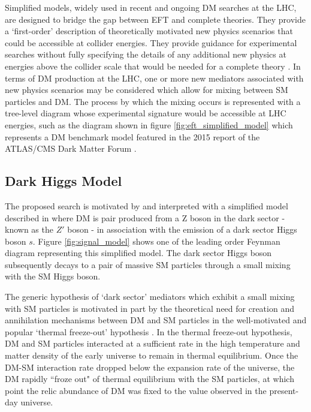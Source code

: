 \documentclass[12pt]{article}
\begin{document}
Simplified models, widely used in recent and ongoing DM searches at the LHC, are designed to bridge the gap between EFT and complete theories. They provide a `first-order' description of theoretically motivated new physics scenarios that could be accessible at collider energies. They provide guidance for experimental searches without fully specifying the details of any additional new physics at energies above the collider scale that would be needed for a complete theory \cite{DM_colliders}. In terms of DM production at the LHC, one or more new mediators associated with new physics scenarios may be considered which allow for mixing between SM particles and DM. The process by which the mixing occurs is represented with a tree-level diagram whose experimental signature would be accessible at LHC energies, such as the diagram shown in figure \ref{fig:eft_simplified_model} which represents a DM benchmark model featured in the 2015 report of the ATLAS/CMS Dark Matter Forum \cite{dm_forum}.

\subsection{Dark Higgs Model}

The proposed search is motivated by and interpreted with a simplified model described in \cite{dark_Higgs} where DM is pair produced from a Z boson in the dark sector - known as the $Z'$ boson - in association with the emission of a dark sector Higgs boson $s$. Figure \ref{fig:signal_model} shows one of the leading order Feynman diagram representing this simplified model. The dark sector Higgs boson subsequently decays to a pair of massive SM particles through a small mixing with the SM Higgs boson. 

The generic hypothesis of `dark sector' mediators which exhibit a small mixing with SM particles is motivated in part by the theoretical need for creation and annihilation mechanisms between DM and SM particles in the well-motivated and popular `thermal freeze-out' hypothesis \cite{particle_dm}. In the thermal freeze-out hypothesis, DM and SM particles interacted at a sufficient rate in the high temperature and matter density of the early universe to remain in thermal equilibrium. Once the DM-SM interaction rate dropped below the expansion rate of the universe, the DM rapidly ``froze out" of thermal equilibrium with the SM particles, at which point the relic abundance of DM was fixed to the value observed in the present-day universe.
\end{document}
